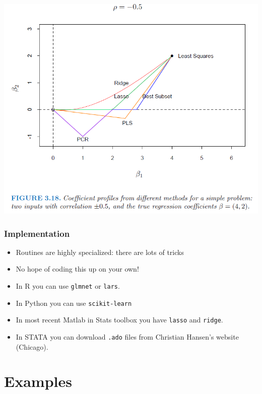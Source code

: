 \begin{frame}
    \vspace{-10pt}
    \begin{center}
    \includegraphics[height=0.85\textheight]{./resources/ESLshrinkpathNegative}
    \end{center}
\end{frame}

\begin{frame}
\frametitle{Implementation}
\begin{itemize}
\item Routines are highly specialized: there are lots of tricks
\item No hope of coding this up on your own!
\item In R you can use \texttt{glmnet} or \texttt{lars}.
\item In Python you can use \texttt{scikit-learn}
\item In most recent Matlab in Stats toolbox you have \texttt{lasso} and \texttt{ridge}.
\item In STATA you can download \texttt{.ado} files from Christian Hansen's website (Chicago).
\end{itemize}
\end{frame}

\section{Examples}

